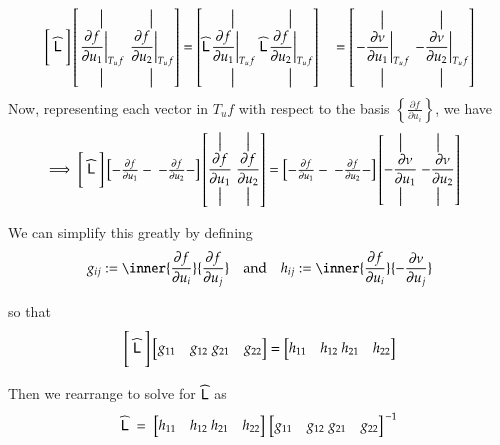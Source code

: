	\begin{align}
	\Bigg[ \;\widehat{\mathsf{L}}\; \Bigg]
	\left[ \overset{\big\vert}{\underset{\big\vert}{\left.\frac{\partial f}{\partial u_1}\right|_{T_u f}}} \;
			\overset{\big\vert}{\underset{\big\vert}{\left.\frac{\partial f}{\partial u_2}\right|_{T_u f}}} \right]
			&= \left[ \widehat{\mathsf{L}} \overset{\big\vert}{\underset{\big\vert}{\left.\frac{\partial f}{\partial u_1}\right|_{T_u f}}} \;
			\widehat{\mathsf{L}} \overset{\big\vert}{\underset{\big\vert}{\left.\frac{\partial f}{\partial u_2}\right|_{T_u f}}} \right] \
			&= \left[ \overset{\big\vert}{\underset{\big\vert}{ \left.-\frac{\partial \nu}{\partial u_1}\right|_{T_u f}}} \;
			\overset{\big\vert}{\underset{\big\vert}{\left.-\frac{\partial \nu}{\partial u_2}\right|_{T_u f}}} \right]
			\end{align}
			Now, representing each vector in  $T_u f$ with respect to the basis $\left\{ \frac{\partial f}{\partial u_i}\right\}$, we have
			\begin{align}
			\implies
			\Bigg[ \;\widehat{\mathsf{L}}\; \Bigg]
			\begin{bmatrix} - \frac{\partial f}{\partial u_1} - \
				- \frac{\partial f}{\partial u_2} -
							\end{bmatrix}
			\left[ \overset{\big\vert}{\underset{\big\vert}{\frac{\partial f}{\partial u_1}}} \;
				\overset{\big\vert}{\underset{\big\vert}{\frac{\partial f}{\partial u_2}}}\right]
				&= \begin{bmatrix} - \frac{\partial f}{\partial u_1} - \
				- \frac{\partial f}{\partial u_2} -
				\end{bmatrix}
				\left[ \overset{\big\vert}{\underset{\big\vert}{-\frac{\partial \nu}{\partial u_1}}} \;
				\overset{\big\vert}{\underset{\big\vert}{-\frac{\partial \nu}{\partial u_2}}}\right]
	\end{align}
		 
	We can simplify this greatly by defining 
	\begin{equation}\label{fundamentalformcoefficients}
	g_{ij} := \inner{\frac{\partial f}{\partial u_i}}{\frac{\partial f}{\partial u_j}}
	\quad \textrm{and}\quad
	h_{ij} := \inner{\frac{\partial f}{\partial u_i}}{-\frac{\partial \nu}{\partial u_j}}
	\end{equation}
	
	so that
	\begin{equation}
	\Bigg[ \;\widehat{\mathsf{L}}\; \Bigg]
	\begin{bmatrix} g_{11} & g_{12} \ g_{21} & g_{22} \end{bmatrix}
	= \begin{bmatrix} h_{11} & h_{12} \ h_{21} & h_{22} \end{bmatrix}
	\end{equation}
	
	Then we rearrange to solve for $\widehat{\mathsf{L}}$ as
		\begin{equation} \label{weinmatconstruction}
		\widehat{\mathsf{L}}
		\;=\; \begin{bmatrix} h_{11} & h_{12} \ h_{21} & h_{22} \end{bmatrix}
		\left.\begin{bmatrix} g_{11} & g_{12} \ g_{21} & g_{22} \end{bmatrix}\right.^{-1}
		\end{equation}
	
